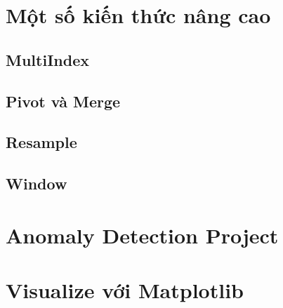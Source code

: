 \documentclass[
]{book}
\begin{document}
\hypertarget{mux1ed9t-sux1ed1-kiux1ebfn-thux1ee9c-nuxe2ng-cao}{%
\chapter{Một số kiến thức nâng cao}\label{mux1ed9t-sux1ed1-kiux1ebfn-thux1ee9c-nuxe2ng-cao}}

\hypertarget{multiindex}{%
\section{MultiIndex}\label{multiindex}}

\hypertarget{pivot-vuxe0-merge}{%
\section{Pivot và Merge}\label{pivot-vuxe0-merge}}

\hypertarget{resample}{%
\section{Resample}\label{resample}}

\hypertarget{window}{%
\section{Window}\label{window}}

\hypertarget{anomaly-detection-project}{%
\chapter{Anomaly Detection Project}\label{anomaly-detection-project}}

\hypertarget{visualize-vux1edbi-matplotlib}{%
\chapter{Visualize với Matplotlib}\label{visualize-vux1edbi-matplotlib}}

  
\end{document}
